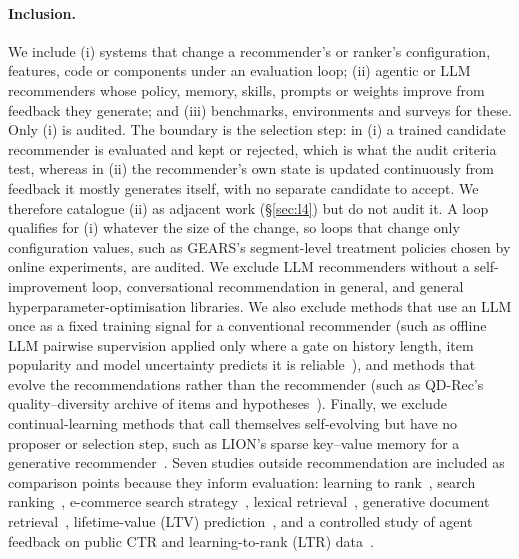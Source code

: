 \documentclass[sigconf,nonacm]{acmart}
\begin{document}
\paragraph{Inclusion.} We include (i) systems that change a recommender's or ranker's configuration, features, code or
components under an evaluation loop; (ii) agentic or LLM recommenders whose policy, memory, skills, prompts or weights
improve from feedback they generate; and (iii) benchmarks, environments and surveys for these. Only (i) is audited.
The boundary is the selection step: in (i) a trained candidate recommender is evaluated and kept or rejected, which is
what the audit criteria test, whereas in (ii) the recommender's own state is updated continuously from feedback it
mostly generates itself, with no separate candidate to accept. We therefore catalogue (ii) as adjacent work
(\S\ref{sec:l4}) but do not audit it. A loop qualifies for (i) whatever the size of the change, so loops that change
only configuration values, such as GEARS's segment-level treatment policies chosen by online experiments, are audited. We exclude LLM
recommenders without a self-improvement loop, conversational recommendation in general, and general
hyperparameter-optimisation libraries. We also exclude methods that use an LLM once as a fixed training signal for a
conventional recommender (such as offline LLM pairwise supervision applied only where a gate on history length,
item popularity and model uncertainty predicts it is reliable~\cite{shi2026selective}), and methods that evolve the recommendations rather than the recommender (such as
QD-Rec's quality--diversity archive of items and hypotheses~\cite{ishida2026qdrec}). Finally, we exclude continual-learning methods
that call themselves self-evolving but have no proposer or selection step, such as LION's sparse key--value memory
for a generative recommender~\cite{lin2026lion}. Seven studies outside recommendation are included as comparison points because they
inform evaluation: learning to rank~\cite{patel2026evorank}, search ranking~\cite{wu2026coscientist}, e-commerce search
strategy~\cite{wang2026pear}, lexical retrieval~\cite{nian2026rankevolveir}, generative document
retrieval~\cite{nian2026semanticindex}, lifetime-value (LTV) prediction~\cite{wu2026agentltv}, and a controlled study of
agent feedback on public CTR and learning-to-rank (LTR) data~\cite{yao2026feedbackcontract}.
\end{document}
